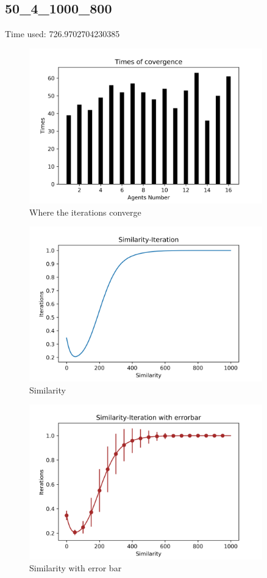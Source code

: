 \documentclass[a4paper,12pt]{article}
\begin{document}
    \subsection{50\_4\_1000\_800}
    Time used: 726.9702704230385
        	\begin{figure}[H]
    	\centering
    	\includegraphics[width=0.9\textwidth]{agt50_4_1000_800}
    	\caption{Where the iterations converge}\label{agt50_4_1000_800}
    \end{figure}
    \begin{figure}[H]
    	\centering
    	\includegraphics[width=0.9\textwidth]{Sim50_4_1000_800}
    	\caption{Similarity}\label{Sim50_4_1000_800}
    \end{figure}
    \begin{figure}[H]
    	\centering
    	\includegraphics[width=0.9\textwidth]{SimErr50_4_1000_800}
    	\caption{Similarity with error bar}\label{SimErr50_4_1000_800}
    \end{figure}
\end{document}
